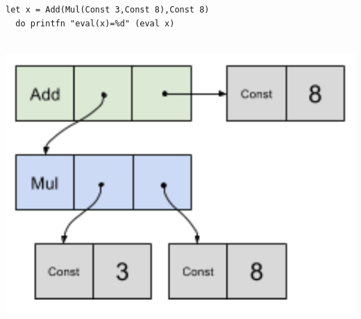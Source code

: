 \documentclass[rgb]{beamer}
\begin{document}
\begin{frame}[fragile]
\begin{footnotesize}
\begin{minipage}{0.7\textwidth}
\begin{lstlisting}[numbers=none,frame=none,mathescape]
  let x = Add(Mul(Const 3,Const 8),Const 8)
  do printfn "eval(x)=%d" (eval x)
\end{lstlisting}
\end{minipage}\begin{minipage}{0.25\textwidth}
\vspace{-1cm}~\hspace{-1cm}
  \includegraphics[width=1.4\textwidth]{../images/addmul.png}

\end{minipage}

\end{footnotesize}
\end{frame}
\end{document}
